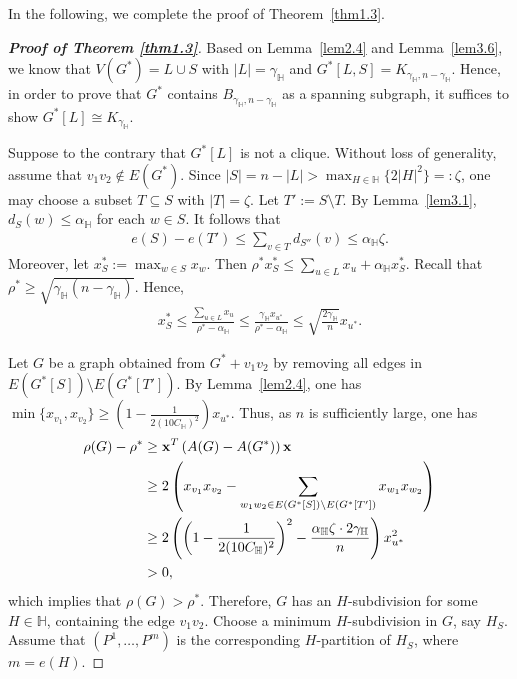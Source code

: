 \documentclass[11pt, a4paper]{article}
\theoremstyle{definition}
\newcommand{\<}{\subseteq}
\begin{document}
In the following, we complete the proof of Theorem~\ref{thm1.3}.
\begin{proof}[\bf Proof of Theorem \ref{thm1.3}]
Based on Lemma~\ref{lem2.4} and  Lemma~\ref{lem3.6}, we know that $V(G^*)=L\cup S$ with $|L|=\gamma_\mathbb{H}$ and $G^*[L,S]=K_{\gamma_\mathbb{H},n-\gamma_\mathbb{H}}$. Hence, in order to prove that $G^*$ contains $B_{\gamma_\mathbb{H},n-\gamma_\mathbb{H}}$ as a spanning subgraph, it suffices to show $G^*[L]\cong K_{\gamma_\mathbb{H}}$.

    Suppose to the contrary that $G^*[L]$ is not a clique. Without loss of generality, assume that $v_1v_2\notin E(G^*)$. 
    Since $|S|=n-|L|>\max_{H\in \mathbb{H}}\{2|H|^2\}=:\zeta$, one may choose a subset $T\subseteq S$ with $|T|=\zeta$.
    Let $T':=S\setminus T$.
    By Lemma~\ref{lem3.1}, $d_{S}(w)\leq\alpha_\mathbb{H}$ for each $w\in S$.
    It follows that %
    \begin{align*}
        e(S)-e(T')\leq \sum_{v\in T}d_{S''}(v)\leq \alpha_\mathbb{H}\zeta.
    \end{align*}
    Moreover, let $x_{S}^*:=\max_{w\in S}x_w$.
    Then $\rho^*x_{S}^*\leq\sum_{u\in L}x_u+\alpha_\mathbb{H}x_{S}^*$. Recall that $\rho^*\geq \sqrt{\gamma_\mathbb{H}(n-\gamma_\mathbb{H})}$.
    Hence,
    \begin{align*}
        x_{S}^*\leq\frac{\sum_{u\in L}x_u}{\rho^*-\alpha_\mathbb{H}}\leq\frac{\gamma_\mathbb{H}x_{u^*}}{\rho^*-\alpha_\mathbb{H}}\leq\sqrt{\frac{2\gamma_\mathbb{H}}{n}}x_{u^*}.
    \end{align*}

    Let $G$ be a graph obtained from $G^*+v_1v_2$ by removing all edges in $E(G^*[S])\setminus E(G^*[T'])$.
    By Lemma~\ref{lem2.4}, one has $\min\{x_{v_1},x_{v_2}\}\geq(1-\frac{1}{2(10C_\mathbb{H})^2})x_{u^*}$. Thus, as $n$ is sufficiently large, one has 
    \begin{align*}
        \rho(G)-\rho^*&\geq {\bf x}^T\left(A(G)-A(G^*)\right){\bf x}\\
        &\geq 2\left(x_{v_1}x_{v_2}-\sum_{w_1w_2\in E(G^*[S])\setminus E(G^*[T'])}x_{w_1}x_{w_2}\right)\\&\geq 2\left(\left(1-\frac{1}{2(10C_\mathbb{H})^2}\right)^2-\frac{\alpha_\mathbb{H}\zeta\cdot 2\gamma_\mathbb{H}}{n}\right)x_{u^*}^2\\&>0, 
    \end{align*}
    which implies that $\rho(G)>\rho^*$. Therefore, $G$ has an $H$-subdivision for some $H\in\mathbb{H}$, containing the edge $v_1v_2$. Choose a minimum  $H$-subdivision in $G$, say $H_S$. Assume that $(P^1,\ldots,P^{m})$ is the corresponding $H$-partition of $H_S$, where $m=e(H)$.


\end{proof}
\end{document}

